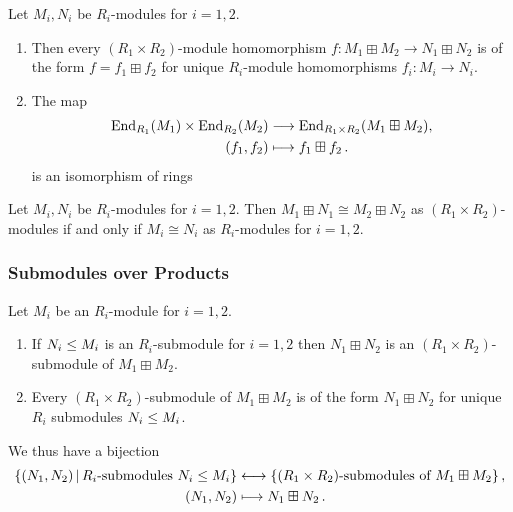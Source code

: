 \begin{corollary}
  \label{label: endomorphism ring of boxsum}
  Let $M_i, N_i$ be $R_i$-modules for $i = 1, 2$.
  \begin{enumerate}
    \item
      Then every $(R_1 \times R_2)$-module homomorphism $f \colon M_1 \boxplus M_2 \to N_1 \boxplus N_2$ is of the form $f = f_1 \boxplus f_2$ for unique $R_i$-module homomorphisms $f_i \colon M_i \to N_i$.
    \item
      The map
      \begin{align*}
                  \operatorname{End}_{R_1}(M_1) \times \operatorname{End}_{R_2}(M_2)
        &\longrightarrow  \operatorname{End}_{R_1 \times R_2}(M_1 \boxplus M_2),
        \\
                      (f_1, f_2)
        &\longmapsto  f_1 \boxplus f_2 \,.
      \end{align*}
      is an isomorphism of rings
  \end{enumerate}
\end{corollary}


\begin{corollary}
  Let $M_i, N_i$ be $R_i$-modules for $i = 1, 2$.
  Then $M_1 \boxplus N_1 \cong M_2 \boxplus N_2$ as $(R_1 \times R_2)$-modules if and only if $M_i \cong N_i$ as $R_i$-modules for $i = 1, 2$.
\end{corollary}





\subsubsection{Submodules over Products}


\begin{lemma}
  Let $M_i$ be an $R_i$-module for $i = 1, 2$.
  \begin{enumerate}
    \item
      If $N_i \leq M_i$ is an $R_i$-submodule for $i = 1, 2$ then $N_1 \boxplus N_2$ is an $(R_1 \times R_2)$-submodule of $M_1 \boxplus M_2$.
    \item
      Every $(R_1 \times R_2)$-submodule of $M_1 \boxplus M_2$ is of the form $N_1 \boxplus N_2$ for unique $R_i$ submodules $N_i \leq M_i$.
  \end{enumerate}
  We thus have a bijection
  \begin{align*}
    \{ (N_1, N_2) \suchthat \text{$R_i$-submodules $N_i \moduleeq M_i$} \}
    &\longleftrightarrow
    \{ \text{$(R_1 \times R_2)$-submodules of $M_1 \boxplus M_2$} \} \,,
    \\
    (N_1, N_2)
    &\longmapsto
    N_1 \boxplus N_2 \,.
  \end{align*}
\end{lemma}


